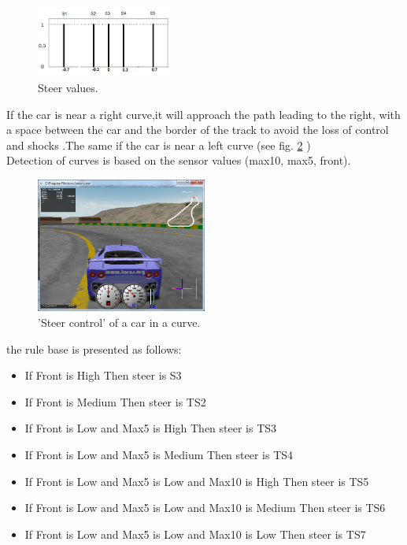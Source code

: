 \documentclass{llncs}
\begin{document}
\begin{enumerate}
	
	\begin{figure}[h!]
		
		\centering
		\includegraphics[width=0.4\textwidth]{fig/speed2.png}
		\begin{minipage}{10cm}
			\centering
			\caption{\footnotesize Steer values.}
			\label{fontfig6}
		\end{minipage} 
	\end{figure}
	
	
	
	If the car is near a right curve,it will approach the path leading to the right, with a space between the car and the border of the track to avoid the loss of control and shocks .The same if the car is near a left curve (see fig. \ref {steercont} ) \\
	
	Detection of curves is based on the sensor values (max10, max5, front).
	
	\begin{figure}[h!]
		
		\centering
		\includegraphics[width=0.5\textwidth]{fig/steercont.png}
		\begin{minipage}{10cm}
			\centering
			\caption{\footnotesize 'Steer control' of a car in a curve.}
			\label{steercont}
		\end{minipage} 
	\end{figure}
	the rule base is presented as follows:\\
	\begin{itemize}
		
		\item If Front is High Then steer is S3
		\item If Front is Medium Then steer is TS2
		\item If Front is Low and Max5 is High Then steer is TS3
		\item If Front is Low and Max5 is Medium Then steer is TS4
		\item If Front is Low and Max5 is Low and Max10 is High Then steer is TS5
		\item If Front is Low and Max5 is Low and Max10 is Medium Then steer is TS6
		\item  If Front is Low and Max5 is Low and Max10 is Low Then steer is TS7
		\\
	\end{itemize}	
\end{enumerate}	
\end{document}
